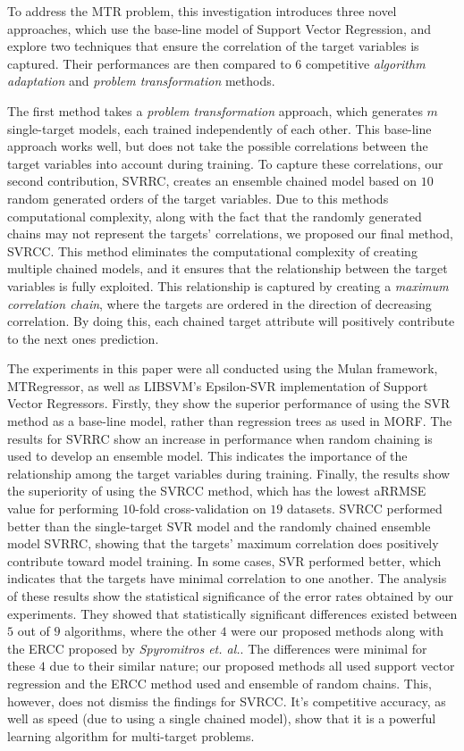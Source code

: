 \documentclass[preprint,12pt]{elsarticle}
\begin{document}
To address the MTR problem, this investigation introduces three novel approaches, which use the base-line model of Support Vector Regression, and explore two techniques that ensure the correlation of the target variables is captured. Their performances are then compared to $6$ competitive \textit{algorithm adaptation} and \textit{problem transformation} methods.

The first method takes a \textit{problem transformation} approach, which generates $m$ single-target models, each trained independently of each other. This base-line approach works well, but does not take the possible correlations between the target variables into account during training. To capture these correlations, our second contribution, SVRRC, creates an ensemble chained model based on $10$ random generated orders of the target variables. Due to this methods computational complexity, along with the fact that the randomly generated chains may not represent the targets' correlations, we proposed our final method, SVRCC. This method eliminates the computational complexity of creating multiple chained models, and it ensures that the relationship between the target variables is fully exploited. This relationship is captured by creating a \textit{maximum correlation chain}, where the targets are ordered in the direction of decreasing correlation. By doing this, each chained target attribute will positively contribute to the next ones prediction.  

The experiments in this paper were all conducted using the Mulan framework, MTRegressor, as well as LIBSVM's Epsilon-SVR implementation of Support Vector Regressors. Firstly, they show the superior performance of using the SVR method as a base-line model, rather than regression trees as used in MORF.  The results for SVRRC show an increase in performance when random chaining is used to develop an ensemble model. This indicates the importance of the relationship among the target variables during training. Finally, the results show the superiority of using the SVRCC method, which has the lowest aRRMSE value for performing $10$-fold cross-validation on $19$ datasets. SVRCC performed better than the single-target SVR model and the randomly chained ensemble model SVRRC, showing that the targets' maximum correlation does positively contribute toward model training. In some cases, SVR performed better, which indicates that the targets have minimal correlation to one another. The analysis of these results show the statistical significance of the error rates obtained by our experiments. They showed that statistically significant differences existed between $5$ out of $9$ algorithms, where the other $4$ were our proposed methods along with the ERCC proposed by \textit{Spyromitros et. al.}. The differences were minimal for these $4$ due to their similar nature; our proposed methods all used support vector regression and the ERCC method used and ensemble of random chains. This, however, does not dismiss the findings for SVRCC. It's competitive accuracy, as well as speed (due to using a single chained model), show that it is a powerful learning algorithm for multi-target problems. 
\end{document}

